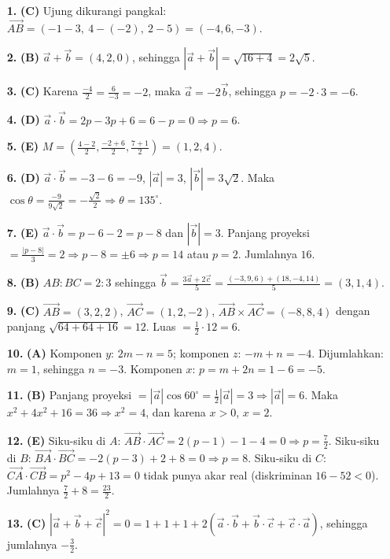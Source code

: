 \documentclass[a4paper,11pt]{article}
\newcommand{\dis}{\displaystyle}
\newcommand{\ov}[1]{\overrightarrow{#1}}
\begin{document}
\small\begin{enumerate}[leftmargin=2em,itemsep=2pt,topsep=2pt]
\item[\textbf{1.}] \textbf{(C)} Ujung dikurangi pangkal: $\ov{AB}=(-1-3,\ 4-(-2),\ 2-5)=(-4,6,-3)$.
\item[\textbf{2.}] \textbf{(B)} $\vec a+\vec b=(4,2,0)$, sehingga $|\vec a+\vec b|=\sqrt{16+4}=2\sqrt5$.
\item[\textbf{3.}] \textbf{(C)} Karena $\dis\frac{-4}{2}=\dis\frac{6}{-3}=-2$, maka $\vec a=-2\vec b$, sehingga $p=-2\cdot3=-6$.
\item[\textbf{4.}] \textbf{(D)} $\vec a\cdot\vec b=2p-3p+6=6-p=0\Rightarrow p=6$.
\item[\textbf{5.}] \textbf{(E)} $M=\left(\dis\frac{4-2}{2},\dis\frac{-2+6}{2},\dis\frac{7+1}{2}\right)=(1,2,4)$.
\item[\textbf{6.}] \textbf{(D)} $\vec a\cdot\vec b=-3-6=-9$, $|\vec a|=3$, $|\vec b|=3\sqrt2$. Maka $\cos\theta=\dis\frac{-9}{9\sqrt2}=-\dis\frac{\sqrt2}{2}\Rightarrow\theta=135^\circ$.
\item[\textbf{7.}] \textbf{(E)} $\vec a\cdot\vec b=p-6-2=p-8$ dan $|\vec b|=3$. Panjang proyeksi $=\dis\frac{|p-8|}{3}=2\Rightarrow p-8=\pm6\Rightarrow p=14$ atau $p=2$. Jumlahnya $16$.
\item[\textbf{8.}] \textbf{(B)} $AB:BC=2:3$ sehingga $\vec b=\dis\frac{3\vec a+2\vec c}{5}=\dis\frac{(-3,9,6)+(18,-4,14)}{5}=(3,1,4)$.
\item[\textbf{9.}] \textbf{(C)} $\ov{AB}=(3,2,2)$, $\ov{AC}=(1,2,-2)$, $\ov{AB}\times\ov{AC}=(-8,8,4)$ dengan panjang $\sqrt{64+64+16}=12$. Luas $=\dis\frac12\cdot12=6$.
\item[\textbf{10.}] \textbf{(A)} Komponen $y$: $2m-n=5$; komponen $z$: $-m+n=-4$. Dijumlahkan: $m=1$, sehingga $n=-3$. Komponen $x$: $p=m+2n=1-6=-5$.
\item[\textbf{11.}] \textbf{(B)} Panjang proyeksi $=|\vec a|\cos60^\circ=\dis\frac12|\vec a|=3\Rightarrow|\vec a|=6$. Maka $x^{2}+4x^{2}+16=36\Rightarrow x^{2}=4$, dan karena $x>0$, $x=2$.
\item[\textbf{12.}] \textbf{(E)} Siku-siku di $A$: $\ov{AB}\cdot\ov{AC}=2(p-1)-1-4=0\Rightarrow p=\dis\frac72$. Siku-siku di $B$: $\ov{BA}\cdot\ov{BC}=-2(p-3)+2+8=0\Rightarrow p=8$. Siku-siku di $C$: $\ov{CA}\cdot\ov{CB}=p^{2}-4p+13=0$ tidak punya akar real (diskriminan $16-52<0$). Jumlahnya $\dis\frac72+8=\dis\frac{23}{2}$.
\item[\textbf{13.}] \textbf{(C)} $|\vec a+\vec b+\vec c|^{2}=0=1+1+1+2(\vec a\cdot\vec b+\vec b\cdot\vec c+\vec c\cdot\vec a)$, sehingga jumlahnya $-\dis\frac32$.

\end{enumerate}
\end{document}
